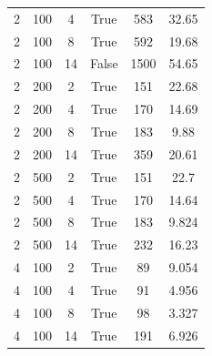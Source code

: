 \begin{table}[H]
\begin{tabular}{cccccc}
		2             & 100                             & 4                        & True             & 583           & 32.65             \\
		2             & 100                             & 8                        & True             & 592           & 19.68             \\
		2             & 100                             & 14                       & False            & 1500          & 54.65             \\
		2             & 200                             & 2                        & True             & 151           & 22.68             \\
		2             & 200                             & 4                        & True             & 170           & 14.69             \\
		2             & 200                             & 8                        & True             & 183           & 9.88              \\
		2             & 200                             & 14                       & True             & 359           & 20.61             \\
		2             & 500                             & 2                        & True             & 151           & 22.7              \\
		2             & 500                             & 4                        & True             & 170           & 14.64             \\
		2             & 500                             & 8                        & True             & 183           & 9.824             \\
		2             & 500                             & 14                       & True             & 232           & 16.23             \\
		\midrule
		4             & 100                             & 2                        & True             & 89            & 9.054             \\
		4             & 100                             & 4                        & True             & 91            & 4.956             \\
		4             & 100                             & 8                        & True             & 98            & 3.327             \\
		4             & 100                             & 14                       & True             & 191           & 6.926             \\

\end{tabular}
\end{table}
